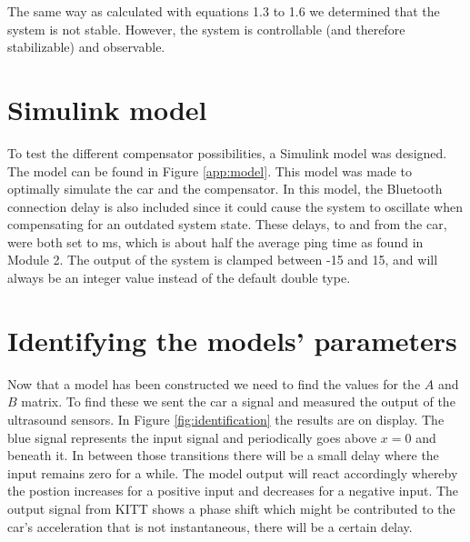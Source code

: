\documentclass[final]{scrreprt} %
\begin{document}
The same way as calculated with equations 1.3 to 1.6 we determined that the system is not stable.
However, the system is controllable (and therefore stabilizable) and observable.

\section*{Simulink model}
To test the different compensator possibilities, a Simulink model was designed.
The model can be found in Figure \ref{app:model}.
This model was made to optimally simulate the car and the compensator.
In this model, the Bluetooth connection delay is also included since it could cause the system to oscillate when compensating for an outdated system state.
These delays, to and from the car, were both set to \unit[50]{ms}, which is about half the average ping time as found in Module 2.
The output of the system is clamped between -15 and 15, and will always be an integer value instead of the default double type.

\section*{Identifying the models' parameters}
Now that a model has been constructed we need to find the values for the $A$ and $B$ matrix.
To find these we sent the car a signal and measured the output of the ultrasound sensors.
In Figure \ref{fig:identification} the results are on display.
The blue signal represents the input signal and periodically goes above $x=0$ and beneath it.
In between those transitions there will be a small delay where the input remains zero for a while.
The model output will react accordingly whereby the postion increases for a positive input and decreases for a negative input.
The output signal from KITT shows a phase shift which might be contributed to the car's acceleration that is not instantaneous, there will be a certain delay.
\end{document}
